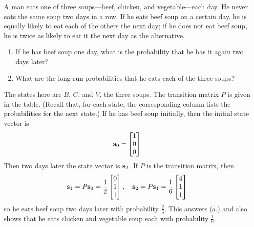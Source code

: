 \documentclass{ximera}
\begin{document}
\begin{example}\label{007416}
A man eats one of three soups---beef, chicken, and vegetable---each day. He never eats the same soup two days in a row. If he eats beef soup on a certain day, he is equally likely to eat each of the others the next day; if he does not eat beef soup, he is twice as likely to eat it the next day as the alternative.


\begin{enumerate}
\item If he has beef soup one day, what is the probability that he has it again two days later?

\item What are the long-run probabilities that he eats each of the three soups?

\end{enumerate}

\begin{explanation}
  The states here are $B$, $C$, and $V$, the three soups. The transition matrix $P$ is given in the table. (Recall that, for each state, the corresponding column lists the probabilities for the next state.)
If he has beef soup initially, then the initial state vector is
\begin{equation*}
{\bf s}_0 = \begin{bmatrix}
1 \\
0 \\
0
\end{bmatrix} 
\end{equation*}
Then two days later the state vector is ${\bf s}_{2}$. If $P$ is the transition matrix, then
\begin{equation*}
{\bf s}_1 = P{\bf s}_0 = \frac{1}{2} \begin{bmatrix}
0 \\
1 \\
1
\end{bmatrix}, \quad
{\bf s}_2 = P{\bf s}_1 = \frac{1}{6} \begin{bmatrix}
4 \\
1 \\
1
\end{bmatrix}
\end{equation*}
so he eats beef soup two days later with probability $\frac{2}{3}$. This answers (a.) and also shows that he eats chicken and vegetable soup each with probability $\frac{1}{6}$.



\end{explanation}
\end{example}
\end{document}

